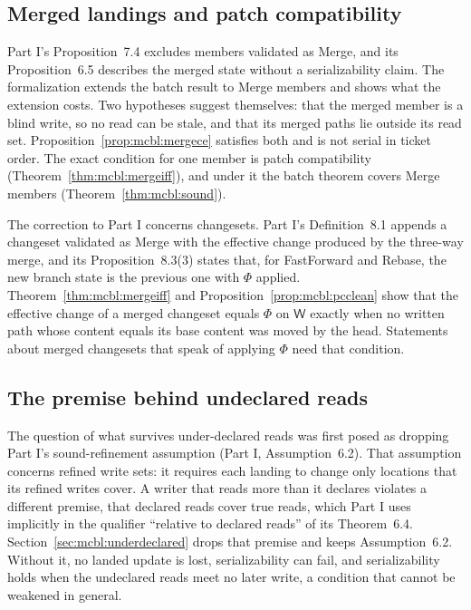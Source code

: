 \documentclass[11pt,letterpaper]{article}
\theoremstyle{definition}
\theoremstyle{remark}
\newcommand{\W}{\mathsf{W}}
\begin{document}
\subsection{Merged landings and patch compatibility}

Part I's Proposition~7.4 excludes members validated as Merge, and its Proposition~6.5 describes the merged state without a serializability claim. The formalization extends the batch result to Merge members and shows what the extension costs. Two hypotheses suggest themselves: that the merged member is a blind write, so no read can be stale, and that its merged paths lie outside its read set. Proposition~\ref{prop:mcbl:mergece} satisfies both and is not serial in ticket order. The exact condition for one member is patch compatibility (Theorem~\ref{thm:mcbl:mergeiff}), and under it the batch theorem covers Merge members (Theorem~\ref{thm:mcbl:sound}).

The correction to Part I concerns changesets. Part I's Definition~8.1 appends a changeset validated as Merge with the effective change produced by the three-way merge, and its Proposition~8.3(3) states that, for FastForward and Rebase, the new branch state is the previous one with $\Phi$ applied. Theorem~\ref{thm:mcbl:mergeiff} and Proposition~\ref{prop:mcbl:pcclean} show that the effective change of a merged changeset equals $\Phi$ on $\W$ exactly when no written path whose content equals its base content was moved by the head. Statements about merged changesets that speak of applying $\Phi$ need that condition.

\subsection{The premise behind undeclared reads}

The question of what survives under-declared reads was first posed as dropping Part I's sound-refinement assumption (Part I, Assumption~6.2). That assumption concerns refined write sets: it requires each landing to change only locations that its refined writes cover. A writer that reads more than it declares violates a different premise, that declared reads cover true reads, which Part I uses implicitly in the qualifier ``relative to declared reads'' of its Theorem~6.4. Section~\ref{sec:mcbl:underdeclared} drops that premise and keeps Assumption~6.2. Without it, no landed update is lost, serializability can fail, and serializability holds when the undeclared reads meet no later write, a condition that cannot be weakened in general.
\end{document}

